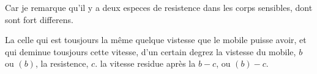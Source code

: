 \pend
\begin{Geometrico}
\hspace{7,5mm}Car je remarque qu'il y a deux especes de resistence dans les corps sensibles,
dont 
sont fort differens.
\end{Geometrico}
\begin{Geometrico}%
La\protect{}
celle qui est tousjours la m\^{e}me quelque vistesse\protect{} que le mobile puisse avoir,
et qui deminue tousjours
cette vitesse, d'un certain degrez
la vistesse du mobile, $\displaystyle b$ ou $\displaystyle (b)$,
la resistence, $\displaystyle c.$ la vitesse residue apr\`{e}s la
$\displaystyle b - c$, ou $\displaystyle (b) - c$.
\end{Geometrico}
\count{}
\count{}
\count{}
